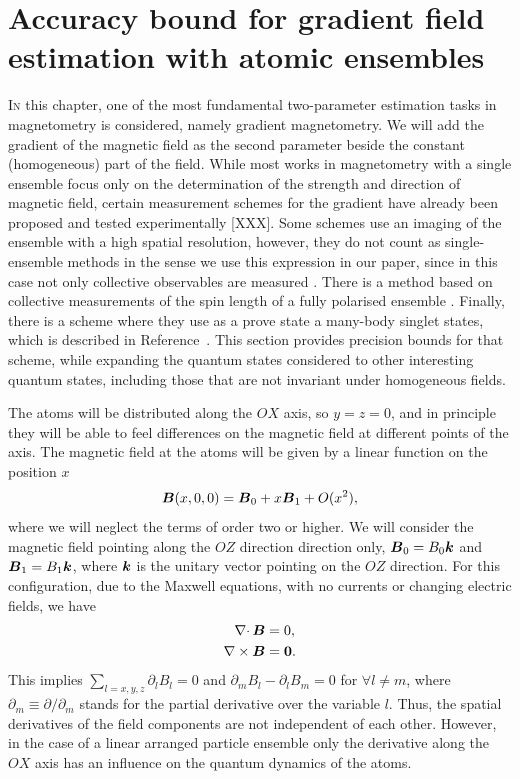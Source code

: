 \section[Metrology of the gradient magnetic field]
{Accuracy bound for gradient field estimation with atomic ensembles}


\lettrine[lines=2, findent=3pt, nindent=0pt]{I}{n} this chapter, one of the most fundamental two-parameter estimation tasks in magnetometry is considered, namely gradient magnetometry.
We will add the gradient of the magnetic field as the second parameter beside the constant (homogeneous) part of the field.
While most works in magnetometry with a single ensemble focus only on the determination of the strength and direction of magnetic field, certain measurement schemes for the gradient have already been proposed and tested experimentally [XXX].
Some schemes use an imaging of the ensemble with a high spatial resolution, however, they do not count as single-ensemble methods in the sense we use this expression in our paper, since in this case not only collective observables are measured  \cite{Vengalattore2007,Zhou2010,Koschorreck2011}.
There is a method based on collective measurements of the spin length of a fully polarised ensemble \cite{Behbood2013}.
Finally, there is a scheme where they use as a prove state a many-body singlet states, which is described in Reference~\cite{Urizar-Lanz2013}.
This section provides precision bounds for that scheme, while expanding the quantum states considered to other interesting quantum states, including those that are not invariant under homogeneous fields.

The atoms will be distributed along the $OX$ axis, so $y=z=0$, and in principle they will be able to feel differences on the magnetic field at different points of the axis.
The magnetic field at the atoms will be given by a linear function on the position $x$
\begin{equation}
\boldsymbol{B}(x,0,0)=\boldsymbol{B}_0 +x \boldsymbol{B}_1 + O(x^2),
\end{equation}
where we will neglect the terms of order two or higher.
We will consider the magnetic field pointing along the $OZ$ direction direction only, $\boldsymbol{B}_0=B_0 \boldsymbol{k}$ and $\boldsymbol{B}_1=B_1\boldsymbol{k}$, where $\boldsymbol{k}$ is the unitary vector pointing on the $OZ$ direction.
For this configuration, due to the Maxwell equations, with no currents or changing electric fields, we have
\begin{align}
\nabla \cdotp \boldsymbol{B}&=0, \nonumber \\
\nabla \times \boldsymbol{B}&=\boldsymbol{0}.
\end{align}
This implies $\sum_{l=x,y,z} \partial_l B_l=0$ and $ \partial_m B_l - \partial_l B_m =0$ for $\forall l\ne m$, where $\partial_m\equiv \partial/\partial_m$ stands for the partial derivative over the variable $l$.
Thus, the spatial derivatives of the field components are not independent of each other.
However, in the case of a linear arranged particle ensemble only the derivative along the $OX$ axis has an influence on the quantum dynamics of the atoms.

